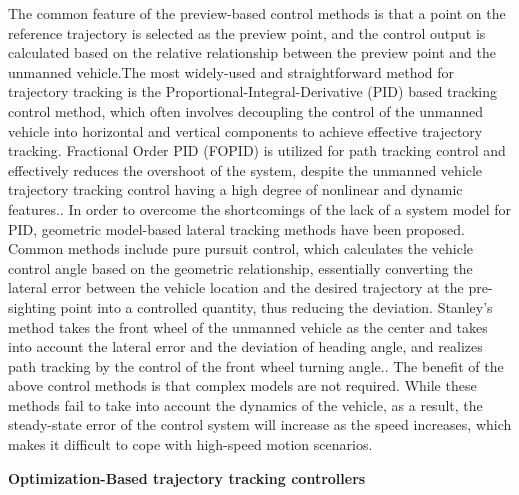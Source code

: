 \documentclass[sn-mathphys]{sn-jnl}%
\theoremstyle{thmstyleone}%
\theoremstyle{thmstyletwo}%
\theoremstyle{thmstylethree}%
\begin{document}
The common feature of the preview-based control methods is that a point on the reference trajectory is selected as the preview point, and the control output is calculated based on the relative relationship between the preview point and the unmanned vehicle.The most widely-used and straightforward method for trajectory tracking is the Proportional-Integral-Derivative (PID) based tracking control method, which often involves decoupling the control of the unmanned vehicle into horizontal and vertical components to achieve effective trajectory tracking. Fractional Order PID (FOPID) is utilized for path tracking control and effectively reduces the overshoot of the system, despite the unmanned vehicle trajectory tracking control having a high degree of nonlinear and dynamic features.\cite{ammarRobustPathTracking2020}.
In order to overcome the shortcomings of the lack of a system model for PID, geometric model-based lateral tracking methods have been proposed. Common methods include pure pursuit control, which calculates the vehicle control angle based on the geometric relationship, essentially converting the lateral error between the vehicle location and the desired trajectory at the pre-sighting point into a controlled quantity, thus reducing the deviation\cite{samuelReviewPurepursuitBased2016}.
Stanley's method takes the front wheel of the unmanned vehicle as the center and takes into account the lateral error and the deviation of heading angle, and realizes path tracking by the control of the front wheel turning angle.\cite{sniderAutomaticSteeringMethods2009}.
The benefit of the above control methods is that complex models are not required. 
While these methods fail to take into account the dynamics of the vehicle, as a result, the steady-state error of the control system will increase as the speed increases, which makes it difficult to cope with high-speed motion scenarios.

\textbf{Optimization-Based trajectory tracking controllers}
\end{document}
